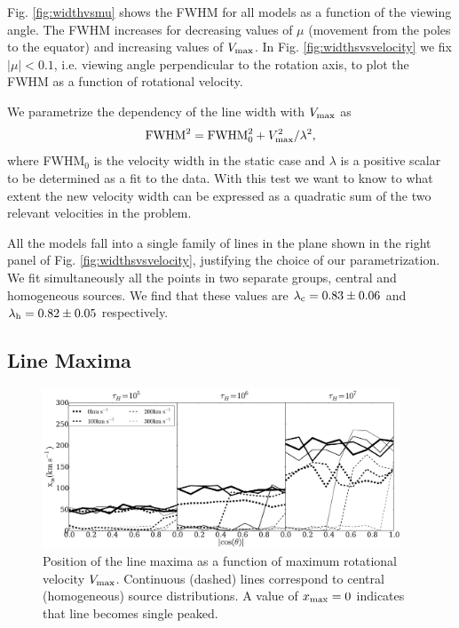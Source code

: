 \documentclass{emulateapj}
\begin{document}
Fig. \ref{fig:widthvsmu} shows the FWHM for all models as a function
of the viewing angle. 
The FWHM increases for decreasing values of $\mu$ (movement from the
poles to the equator) and increasing values of $V_{\rm max}$. 
In Fig.
\ref{fig:widthsvsvelocity} we fix $|\mu|<0.1$, i.e. viewing angle
perpendicular to the rotation axis, to plot the FWHM as a function of
rotational velocity.  


We parametrize the dependency of the line width with  $V_{\rm max}$ as
%
\begin{equation}
 {\rm FWHM}^2 = {\rm FWHM}_{0}^2 + V_{\rm max}^2/\lambda^2,
\label{eq:fwhm}
\end{equation}
%
where FWHM$_{0}$ is the velocity width in the static case and $\lambda$ 
is a positive scalar to be determined as a fit to the data.  
With this test we want to know to what extent the new velocity width can be
expressed as a quadratic sum of the two relevant velocities in the
problem. 

All the models fall into a single family of lines in the plane shown
in the right panel of Fig. \ref{fig:widthsvsvelocity}, justifying
the choice of our parametrization.
We fit simultaneously all the points in two separate groups, central
and homogeneous sources.
We find that these values are $\lambda_{\rm c} = 0.83 \pm 0.06$ and
$\lambda_{\rm    h}= 0.82\pm 0.05$ respectively.    


\subsection{Line Maxima}
\label{sec:maxima}

\begin{figure}
\begin{center}
  \includegraphics[width=0.95\textwidth]{f8.pdf}
\end{center}
\caption{Position of the line maxima as a function of maximum
  rotational   velocity $V_{\rm max}$. Continuous (dashed) lines
  correspond to   central (homogeneous) source distributions. A value
  of $x_{\rm     max}=0$ indicates that line becomes single
  peaked. \label{fig:maximumvsvelocity}}
\end{figure}
\end{document}

